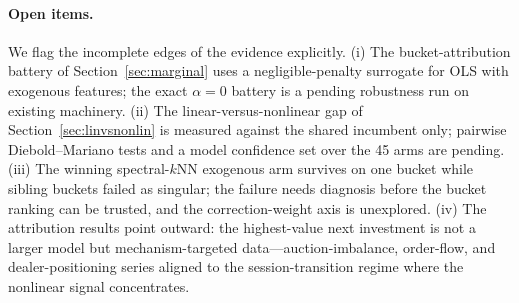 \paragraph{Open items.} We flag the incomplete edges of the evidence explicitly. (i) The bucket-attribution battery of Section~\ref{sec:marginal} uses a negligible-penalty surrogate for OLS with exogenous features; the exact $\alpha=0$ battery is a pending robustness run on existing machinery. (ii) The linear-versus-nonlinear gap of Section~\ref{sec:linvsnonlin} is measured against the shared incumbent only; pairwise Diebold--Mariano tests and a model confidence set over the 45 arms are pending. (iii) The winning spectral-$k$NN exogenous arm survives on one bucket while sibling buckets failed as singular; the failure needs diagnosis before the bucket ranking can be trusted, and the correction-weight axis is unexplored. (iv) The attribution results point outward: the highest-value next investment is not a larger model but mechanism-targeted data---auction-imbalance, order-flow, and dealer-positioning series aligned to the session-transition regime where the nonlinear signal concentrates.
